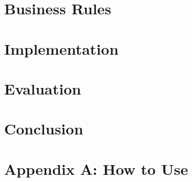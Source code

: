 \documentclass[a4paper]{report}
\begin{document}
\chapter{Business Rules}

\chapter{Implementation}

\chapter{Evaluation}

\chapter{Conclusion}

\chapter{Appendix A: How to Use}


\end{document}
